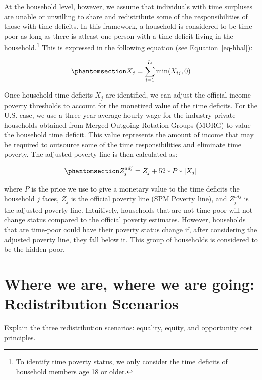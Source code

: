 \documentclass[
  11pt,
]{article}
\begin{document}
At the household level, however, we assume that individuals with time
surpluses are unable or unwilling to share and redistribute some of the
responsibilities of those with time deficits. In this framework, a
household is considered to be time-poor as long as there is atleast one
person with a time deficit living in the household.\footnote{To identify
  time poverty status, we only consider the time deficits of household
  members age 18 or older.} This is expressed in the following equation
(see Equation~\ref{eq-hbal}):

\begin{equation}\phantomsection\label{eq-hbal}{X_{j} = \sum_{i=1}^{I_j} \min(X_{ij},0)
}\end{equation}

Once household time deficits \(X_{j}\) are identified, we can adjust the
official income poverty thresholds to account for the monetized value of
the time deficits. For the U.S. case, we use a three-year average hourly
wage for the industry private households obtained from Merged Outgoing
Rotation Groups (MORG) to value the household time deficit. This value
represents the amount of income that may be required to outsource some
of the time responsibilities and eliminate time poverty. The adjusted
poverty line is then calculated as:

\begin{equation}\phantomsection\label{eq-limtip}{Z_{j}^{adj} = Z_{j} + 52*P* |X_{j}|
}\end{equation}

where \(P\) is the price we use to give a monetary value to the time
deficits the household \({j}\) faces, \(Z_{j}\) is the official poverty
line (SPM Poverty line), and \(Z_{j}^{adj}\) is the adjusted poverty
line. Intuitively, households that are not time-poor will not change
status compared to the official poverty estimates. However, households
that are time-poor could have their poverty status change if, after
considering the adjusted poverty line, they fall below it. This group of
households is considered to be the hidden poor.

\section{Where we are, where we are going: Redistribution
Scenarios}\label{where-we-are-where-we-are-going-redistribution-scenarios}

Explain the three redistribution scenarios: equality, equity, and
opportunity cost principles.
\end{document}
